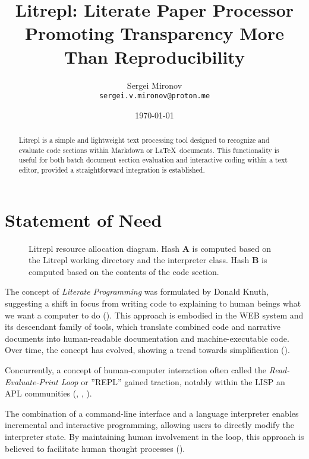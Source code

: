 \documentclass[letterpaper,12pt,twocolumn]{article}
\title{Litrepl: Literate Paper Processor Promoting Transparency More Than Reproducibility}
\author{Sergei Mironov \\
        \texttt{sergei.v.mironov@proton.me}}
\date{\today}
\newcommand{\Latex}{\LaTeX\ }
\begin{document}
\maketitle

\begin{abstract}

Litrepl is a simple and lightweight text processing tool designed to recognize
and evaluate code sections within Markdown or \Latex documents. This
functionality is useful for both batch document section evaluation and
interactive coding within a text editor, provided a straightforward integration
is established.

\end{abstract}

\section{Statement of Need}

\begin{figure*}[!hbt]
  \centering
  
  \caption{Litrepl resource allocation diagram. Hash \textbf{A} is computed
  based on the Litrepl working directory and the interpreter class. Hash
  \textbf{B} is computed based on the contents of the code section.}
  \label{fig:resource-allocation}
\end{figure*}

The concept of \textit{Literate Programming} was formulated by Donald Knuth,
suggesting a shift in focus from writing code to explaining to human beings what
we want a computer to do (\textcite{Knuth1984lp}). This approach is embodied in
the WEB system and its descendant family of tools, which translate combined code
and narrative documents into human-readable documentation and machine-executable
code. Over time, the concept has evolved, showing a trend towards simplification
(\textcite{Ramsey1994lps}).

Concurrently, a concept of human-computer interaction often called the
\textit{Read-Evaluate-Print Loop} or ''REPL'' gained traction, notably within
the LISP an APL communities (\textcite{Spence1975apl},
\textcite{McCarthy1959recfun}, \textcite{Iverson1962apl}).

The combination of a command-line interface and a language interpreter enables
incremental and interactive programming, allowing users to directly modify the
interpreter state. By maintaining human involvement in the loop, this approach
is believed to facilitate human thought processes (\textcite{Granger2021litcomp}).
\end{document}
